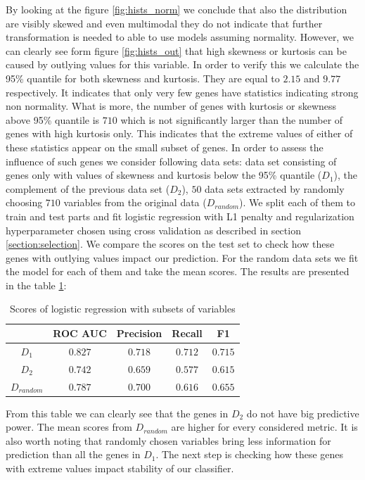 \documentclass[12pt, wide]{mwart}
\begin{document}
By looking at the figure \ref{fig:hists_norm} we conclude that also the distribution are visibly skewed and even multimodal they do not indicate that further transformation is needed to able to use models assuming normality. However, we can clearly see form figure \ref{fig:hists_out} that high skewness or kurtosis can be caused by outlying values for this variable. In order to verify this we calculate the 95\% quantile for both skewness and kurtosis. They are equal to $2.15$ and $9.77$ respectively. It indicates that only very few genes have statistics indicating strong non normality. What is more, the number of genes with kurtosis or skewness above 95\% quantile is $710$ which is not significantly larger than the number of genes with high kurtosis only. This indicates that the extreme values of either of these statistics appear on the small subset of genes. In order to assess the influence of such genes we consider following data sets: data set consisting of genes only with values of skewness and kurtosis below the 95\% quantile ($D_1$), the complement of the previous data set ($D_2$), $50$ data sets extracted by randomly choosing $710$ variables from the original data ($D_{random}$). We split each of them to train and test parts and fit logistic regression with L1 penalty and regularization hyperparameter chosen using cross validation as described in section \ref{section:selection}. We compare the scores on the test set to check how these genes with outlying values impact our prediction. For the random data sets we fit the model for each of them and take the mean scores. The results are presented in the table \ref{tab:scores-trunc}: 
\begin{table}[H]
\centering
    \begin{tabular}[t]{c c c c c}
    \toprule
    & ROC AUC & Precision & Recall & F1\\
    \midrule
    $D_1$ & $0.827$ & $0.718$ &	$0.712$ & $0.715$ \\
    $D_2$ & $0.742$ & $0.659$ & $0.577$ & $0.615$ \\
    $D_{random}$ & $0.787$ & $0.700$ & $0.616$ & $0.655$ \\
    \bottomrule
\end{tabular}
    \caption{Scores of logistic regression with subsets of variables}
    \label{tab:scores-trunc}
\end{table}

From this table we can clearly see that the genes in $D_2$ do not have big predictive power. The mean scores from $D_{random}$ are higher for every considered metric. It is also worth noting that randomly chosen variables bring less information for prediction than all the genes in $D_1$. The next step is checking how these genes with extreme values impact stability of our classifier.
\end{document}
